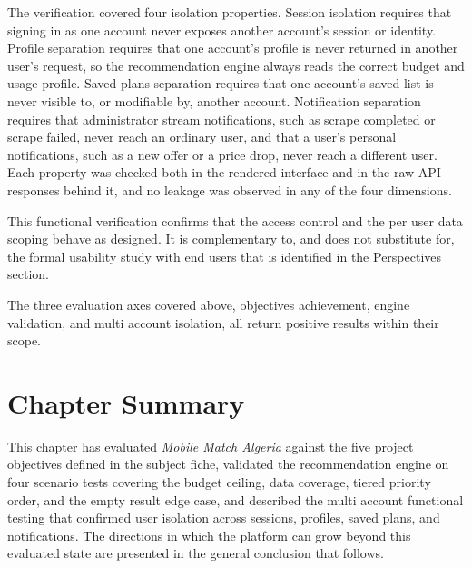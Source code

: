 The verification covered four isolation properties. Session isolation requires that signing in as one account never exposes another account's session or identity. Profile separation requires that one account's profile is never returned in another user's request, so the recommendation engine always reads the correct budget and usage profile. Saved plans separation requires that one account's saved list is never visible to, or modifiable by, another account. Notification separation requires that administrator stream notifications, such as scrape completed or scrape failed, never reach an ordinary user, and that a user's personal notifications, such as a new offer or a price drop, never reach a different user. Each property was checked both in the rendered interface and in the raw API responses behind it, and no leakage was observed in any of the four dimensions.

This functional verification confirms that the access control and the per user data scoping behave as designed. It is complementary to, and does not substitute for, the formal usability study with end users that is identified in the Perspectives section.

The three evaluation axes covered above, objectives achievement, engine validation, and multi account isolation, all return positive results within their scope.

\section{Chapter Summary}

This chapter has evaluated \textit{Mobile Match Algeria} against the five project objectives defined in the subject fiche, validated the recommendation engine on four scenario tests covering the budget ceiling, data coverage, tiered priority order, and the empty result edge case, and described the multi account functional testing that confirmed user isolation across sessions, profiles, saved plans, and notifications. The directions in which the platform can grow beyond this evaluated state are presented in the general conclusion that follows.
